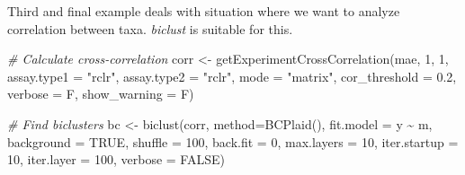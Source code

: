 \documentclass[
]{book}
\newenvironment{Shaded}{\begin{snugshade}}{\end{snugshade}}
\newcommand{\AttributeTok}[1]{\textcolor[rgb]{0.77,0.63,0.00}{#1}}
\newcommand{\CommentTok}[1]{\textcolor[rgb]{0.56,0.35,0.01}{\textit{#1}}}
\newcommand{\ConstantTok}[1]{\textcolor[rgb]{0.00,0.00,0.00}{#1}}
\newcommand{\DecValTok}[1]{\textcolor[rgb]{0.00,0.00,0.81}{#1}}
\newcommand{\FloatTok}[1]{\textcolor[rgb]{0.00,0.00,0.81}{#1}}
\newcommand{\FunctionTok}[1]{\textcolor[rgb]{0.00,0.00,0.00}{#1}}
\newcommand{\NormalTok}[1]{#1}
\newcommand{\OtherTok}[1]{\textcolor[rgb]{0.56,0.35,0.01}{#1}}
\newcommand{\SpecialCharTok}[1]{\textcolor[rgb]{0.00,0.00,0.00}{#1}}
\newcommand{\StringTok}[1]{\textcolor[rgb]{0.31,0.60,0.02}{#1}}
\begin{document}
Third and final example deals with situation where we want to analyze
correlation between taxa. \emph{biclust} is suitable for this.

\begin{Shaded}
\begin{Highlighting}[]
\CommentTok{\# Calculate cross{-}correlation}
\NormalTok{corr }\OtherTok{\textless{}{-}} \FunctionTok{getExperimentCrossCorrelation}\NormalTok{(mae, }\DecValTok{1}\NormalTok{, }\DecValTok{1}\NormalTok{, }
                                      \AttributeTok{assay.type1 =} \StringTok{"rclr"}\NormalTok{, }\AttributeTok{assay.type2 =} \StringTok{"rclr"}\NormalTok{, }
                                      \AttributeTok{mode =} \StringTok{"matrix"}\NormalTok{,}
                                      \AttributeTok{cor\_threshold =} \FloatTok{0.2}\NormalTok{, }\AttributeTok{verbose =}\NormalTok{ F, }\AttributeTok{show\_warning =}\NormalTok{ F)}

\CommentTok{\# Find biclusters}
\NormalTok{bc }\OtherTok{\textless{}{-}} \FunctionTok{biclust}\NormalTok{(corr, }\AttributeTok{method=}\FunctionTok{BCPlaid}\NormalTok{(), }\AttributeTok{fit.model =}\NormalTok{ y }\SpecialCharTok{\textasciitilde{}}\NormalTok{ m,}
              \AttributeTok{background =} \ConstantTok{TRUE}\NormalTok{, }\AttributeTok{shuffle =} \DecValTok{100}\NormalTok{, }\AttributeTok{back.fit =} \DecValTok{0}\NormalTok{, }\AttributeTok{max.layers =} \DecValTok{10}\NormalTok{,}
              \AttributeTok{iter.startup =} \DecValTok{10}\NormalTok{, }\AttributeTok{iter.layer =} \DecValTok{100}\NormalTok{, }\AttributeTok{verbose =} \ConstantTok{FALSE}\NormalTok{)}
\end{Highlighting}
\end{Shaded}

\begin{Shaded}
\end{Shaded}
\end{document}
